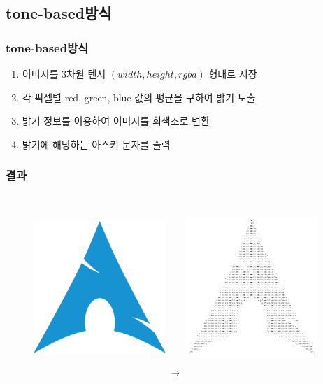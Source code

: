 \documentclass{beamer}
\newcommand{\spacing}{\hspace{0.3em}}
\newcommand{\tonebased}{\textbf{tone-based}}
\begin{document}
	\subsection{\tonebased \spacing 방식}
	\begin{frame}{}
		\frametitle{\tonebased \spacing 방식}
		\begin{enumerate}
			\item 이미지를 3차원 텐서 $ ( width, height, rgba ) $ 형태로 저장
			\item 각 픽셀별 red, green, blue 값의 평균을 구하여 밝기 도출
			\item 밝기 정보를 이용하여 이미지를 회색조로 변환
			\item 밝기에 해당하는 아스키 문자를 출력
		\end{enumerate}
	\end{frame}
	\begin{frame}
		\frametitle{결과}
			\begin{figure}
			\centering
			\includegraphics[align=c, width=5cm, height=7cm]{Input.png}
			\includegraphics[align=c, width=0.5cm, height=0.5cm]{Rightarrow.png}
			\includegraphics[align=c, width=5cm, height=7cm]{ToneBasedOutput.pdf}
			\end{figure}
	\end{frame}
\end{document}

